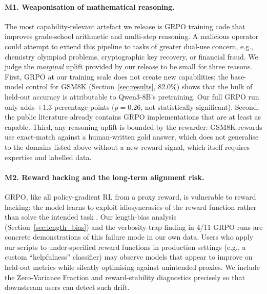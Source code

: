 \paragraph{M1. Weaponisation of mathematical reasoning.}
The most capability-relevant artefact we release is GRPO training code that
improves grade-school arithmetic and multi-step reasoning. A malicious
operator could attempt to extend this pipeline to tasks of greater
dual-use concern, e.g., chemistry olympiad problems, cryptographic key
recovery, or financial fraud. We judge the \emph{marginal} uplift provided
by our release to be small for three reasons. First, GRPO at our training
scale does not create new capabilities; the base-model control for GSM8K
(Section~\ref{sec:results}, 82.0\%) shows that the bulk of held-out
accuracy is attributable to Qwen3-8B's pretraining. Our full GRPO run only
adds \(+1.3\) percentage points ($p{=}0.26$, not statistically significant).
Second, the public literature already contains GRPO implementations
\cite{shao2024deepseekmath, openrlhf2024, verl2024, trl2020} that are at
least as capable. Third, any reasoning uplift is bounded by the rewarder:
GSM8K rewards use exact-match against a human-written gold answer, which
does not generalise to the domains listed above without a new reward
signal, which itself requires expertise and labelled data.

\paragraph{M2. Reward hacking and the long-term alignment risk.}
GRPO, like all policy-gradient RL from a proxy reward, is vulnerable to
reward hacking: the model learns to exploit idiosyncrasies of the reward
function rather than solve the intended task \cite{skalse2022specificationgaming,
krakovna2020specification}. Our length-bias analysis
(Section~\ref{sec:length_bias}) and the verbosity-trap finding in 4/11
GRPO runs are concrete demonstrations of this failure mode in our own data.
Users who apply our scripts to under-specified reward functions in
production settings (e.g., a custom ``helpfulness'' classifier) may observe
models that appear to improve on held-out metrics while silently
optimising against unintended proxies. We include the Zero-Variance
Fraction and reward-stability diagnostics precisely so that downstream
users can detect such drift.

